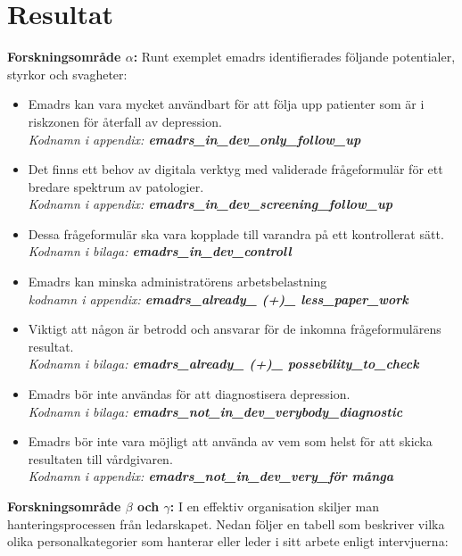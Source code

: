 \documentclass[12pt,a4paper,oneside]{article}
\let\oldcite\cite
\renewcommand*\cite[1]{\textsuperscript{\oldcite{#1}}}
\begin{document}
\section*{Resultat}
{\bf Forskningsomr{\aa}de $\alpha$:} Runt exemplet e{\sc madrs} identifierades f{\"o}ljande potentialer, styrkor och svagheter:
\begin{itemize}
\item E{\sc madrs} kan vara mycket anv{\"a}ndbart f{\"o}r att f{\"o}lja upp patienter som {\"a}r i riskzonen f{\"o}r {\aa}terfall av depression. \\{\it Kodnamn i appendix: {\bfseries emadrs\_in\_dev\_only\_follow\_up}}
\item Det finns ett behov av digitala verktyg med validerade fr{\aa}geformul{\"a}r f{\"o}r ett bredare spektrum av patologier. \\{\it Kodnamn i appendix: {\bfseries emadrs\_in\_dev\_screening\_follow\_up}}
\item Dessa fr{\aa}geformul{\"a}r ska vara kopplade till varandra p{\aa} ett kontrollerat s{\"a}tt. \\{\it Kodnamn i bilaga: {\bfseries emadrs\_in\_dev\_controll}}
\item E{\sc madrs} kan minska administrat{\"o}rens arbetsbelastning \\{\it kodnamn i appendix: {\bfseries emadrs\_already\_ (+)\_ less\_paper\_work}}
\item Viktigt att n{\aa}gon {\"a}r betrodd och ansvarar f{\"o}r de inkomna fr{\aa}geformul{\"a}rens resultat. \\{\it Kodnamn i bilaga: {\bfseries emadrs\_already\_ (+)\_ possebility\_to\_check}}
\item E{\sc madrs} b{\"o}r inte anv{\"a}ndas f{\"o}r att diagnostisera depression. \\{\it Kodnamn i bilaga: {\bfseries emadrs\_not\_in\_dev\_verybody\_diagnostic}}
\item E{\sc madrs} b{\"o}r inte vara m{\"o}jligt att anv{\"a}nda av vem som helst f{\"o}r att skicka resultaten till v{\aa}rdgivaren. \\{\it Kodnamn i appendix: {\bfseries emadrs\_not\_in\_dev\_very\_f{\"o}r m{\aa}nga}}
\end{itemize}
{\bf Forskningsomr{\aa}de $\beta$ och $\gamma$:} I en effektiv organisation skiljer man hanteringsprocessen fr{\aa}n ledarskapet\cite {leader1}. Nedan f{\"o}ljer en tabell som beskriver vilka olika personalkategorier som hanterar eller leder i sitt arbete enligt intervjuerna:\nopagebreak
\end{document}
